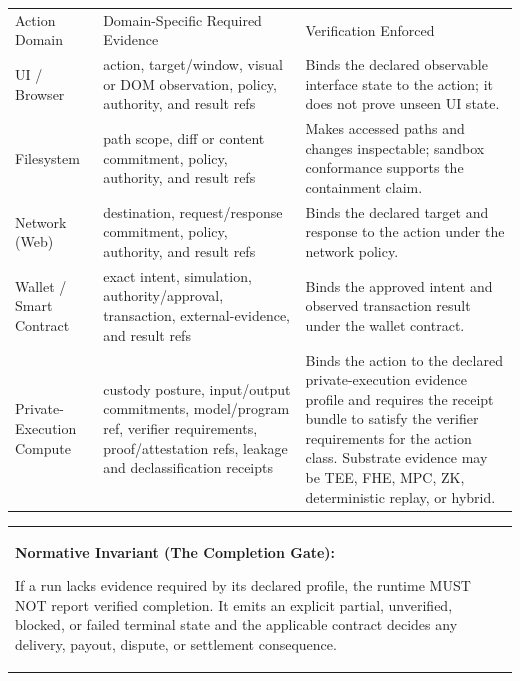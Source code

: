 \documentclass[
  11pt,
]{article}
\begin{document}
\begin{longtable}[]{@{}
  >{\raggedright\arraybackslash}p{}
  >{\raggedright\arraybackslash}p{}
  >{\raggedright\arraybackslash}p{}@{}}
\toprule\noalign{}
& & \\
\midrule\noalign{}
\endhead
\bottomrule\noalign{}
\endlastfoot
Action Domain & Domain-Specific Required Evidence &
Verification Enforced \\
UI / Browser & action, target/window, visual or DOM observation, policy,
authority, and result refs & Binds the declared observable interface state
to the action; it does not prove unseen UI state. \\
Filesystem & path scope, diff or content commitment, policy, authority,
and result refs & Makes accessed paths and changes inspectable; sandbox
conformance supports the containment claim. \\
Network (Web) & destination, request/response commitment, policy,
authority, and result refs & Binds the declared target and response to the
action under the network policy. \\
Wallet / Smart Contract & exact intent, simulation, authority/approval,
transaction, external-evidence, and result refs & Binds the approved intent
and observed transaction result under the wallet contract. \\
Private-Execution Compute & custody posture, input/output commitments,
model/program ref, verifier requirements, proof/attestation refs, leakage
and declassification receipts & Binds the action to the declared
private-execution evidence profile and requires the receipt
bundle to satisfy the verifier requirements for the action class.
Substrate evidence may be TEE, FHE, MPC, ZK, deterministic replay, or
hybrid. \\
\end{longtable}

\begin{longtable}[]{@{}
  >{\raggedright\arraybackslash}p{}@{}}
\toprule\noalign{}
 \\
\midrule\noalign{}
\endhead
\bottomrule\noalign{}
\endlastfoot
\textbf{Normative Invariant (The Completion Gate):}\emph{\textbf{ }}

If a run lacks evidence required by its declared profile, the runtime MUST
NOT report verified completion. It emits an explicit partial, unverified,
blocked, or failed terminal state and the applicable contract decides any
delivery, payout, dispute, or settlement consequence. \\
\end{longtable}
\end{document}

